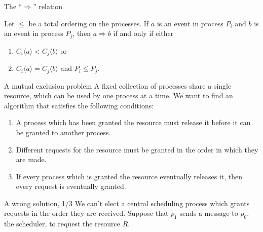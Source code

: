 \documentclass[12pt]{beamer}
\begin{document}
    \begin{frame}{The ``\(\Rightarrow\)'' relation}
        \begin{definition}
            Let \(\le\) be a total ordering on the processes. If \(a\) is an
            event in process \(P_i\) and \(b\) is an event in process \(P_j\), then
            \(a\Rightarrow b\) if and only if either
            \begin{enumerate}
                \item \(C_i\langle a\rangle < C_j\langle b\rangle\) or
                \item \(C_i\langle a\rangle = C_j\langle b\rangle\) and
                \(P_i\le P_j\).
            \end{enumerate}
        \end{definition}
    \end{frame}

    \begin{frame}{A mutual exclusion problem}
        A fixed collection of processes share a single resource, which can be used
        by one process at a time. We want to find an algorithm that satisfies
        the following conditions:
        \begin{enumerate}
            \item A process which has been granted the resource must release it before
            it can be granted to another process.
            \item Different requests for the resource must be granted in the order in
            which they are made.
            \item If every process which is granted the resource eventually releases
            it, then every request is eventually granted.
        \end{enumerate}
    \end{frame}

    \begin{frame}{A wrong solution, 1/3}
        We can't elect a  central scheduling process which grants requests in
        the order they are received. Suppose that \(p_1\) sends a message to
        \(p_0\), the scheduler, to request the resource \(R\).
        \begin{figure}
        \end{figure}
    \end{frame}
\end{document}
